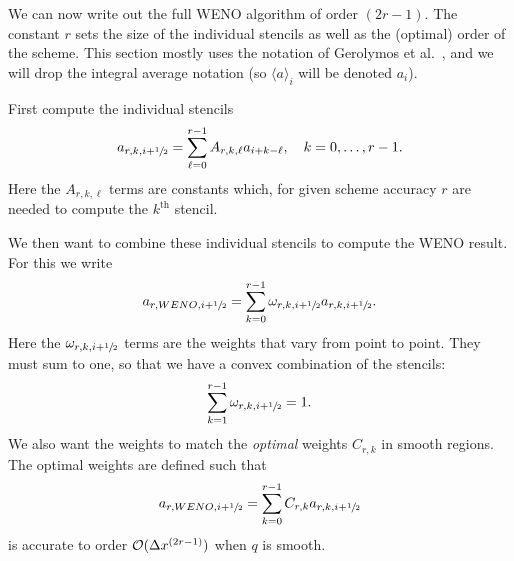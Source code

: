 We can now write out the full WENO algorithm of order $(2 r - 1)$. The constant
$r$ sets the size of the individual stencils as well as the (optimal) order of
the scheme. This section mostly uses the notation of Gerolymos et al.~\cite{Gerolymos2009}, and we will drop the integral average notation (so $\langle a \rangle_i$ will be denoted $a_i$).

First compute the individual stencils
\begin{equation}
  \label{eq:weno-stencils}
  a_{r, k, i+{\sfrac{1}{2}}} = \sum_{\ell=0}^{r-1} A_{r, k, \ell} a_{i+k-\ell}, \quad k = 0, \dots, r-1.
\end{equation}
Here the $A_{r, k, \ell}$ terms are constants which, for given scheme accuracy
$r$ are needed to compute the $k^{\text{th}}$ stencil.

We then want to combine these individual stencils to compute the WENO result.
For this we write
\begin{equation}
  \label{eq:weno-reconstruction}
  a_{r, WENO, i+{\sfrac{1}{2}}} = \sum_{k=0}^{r-1} \omega_{r, k, i+{\sfrac{1}{2}}} a_{r, k, i+{\sfrac{1}{2}}}.
\end{equation}
Here the $\omega_{r, k, i+{\sfrac{1}{2}}}$ terms are the weights that vary from point
to point. They must sum to one, so that we have a convex combination of the
stencils:
\begin{equation}
  \label{eq:weno-convex}
  \sum_{k=1}^{r-1} \omega_{r, k, i+{\sfrac{1}{2}}} = 1.
\end{equation}
We also want the weights to match the \emph{optimal} weights $C_{r, k}$ in
smooth regions. The optimal weights are defined such that
\begin{equation}
  \label{eq:weno-optimal}
  a_{r, WENO, i+{\sfrac{1}{2}}} = \sum_{k=0}^{r-1} C_{r, k} a_{r, k, i+{\sfrac{1}{2}}}
\end{equation}
is accurate to order ${\cal O}(\Delta x^{(2 r - 1)})$ when $q$ is smooth.

